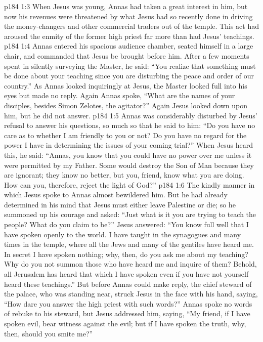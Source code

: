 \vs p184 1:3 When Jesus was young, Annas had taken a great interest in him, but now his revenues were threatened by what Jesus had so recently done in driving the money\hyp{}changers and other commercial traders out of the temple. This act had aroused the enmity of the former high priest far more than had Jesus’ teachings.
\vs p184 1:4 Annas entered his spacious audience chamber, seated himself in a large chair, and commanded that Jesus be brought before him. After a few moments spent in silently surveying the Master, he said: “You realize that something must be done about your teaching since you are disturbing the peace and order of our country.” As Annas looked inquiringly at Jesus, the Master looked full into his eyes but made no reply. Again Annas spoke, “What are the names of your disciples, besides Simon Zelotes, the agitator?” Again Jesus looked down upon him, but he did not answer.
\vs p184 1:5 Annas was considerably disturbed by Jesus’ refusal to answer his questions, so much so that he said to him: “Do you have no care as to whether I am friendly to you or not? Do you have no regard for the power I have in determining the issues of your coming trial?” When Jesus heard this, he said: \textcolor{ubdarkred}{“Annas, you know that you could have no power over me unless it were permitted by my Father. Some would destroy the Son of Man because they are ignorant; they know no better, but you, friend, know what you are doing. How can you, therefore, reject the light of God?”}
\vs p184 1:6 The kindly manner in which Jesus spoke to Annas almost bewildered him. But he had already determined in his mind that Jesus must either leave Palestine or die; so he summoned up his courage and asked: “Just what is it you are trying to teach the people? What do you claim to be?” Jesus answered: \textcolor{ubdarkred}{“You know full well that I have spoken openly to the world. I have taught in the synagogues and many times in the temple, where all the Jews and many of the gentiles have heard me. In secret I have spoken nothing; why, then, do you ask me about my teaching? Why do you not summon those who have heard me and inquire of them? Behold, all Jerusalem has heard that which I have spoken even if you have not yourself heard these teachings.”} But before Annas could make reply, the chief steward of the palace, who was standing near, struck Jesus in the face with his hand, saying, “How dare you answer the high priest with such words?” Annas spoke no words of rebuke to his steward, but Jesus addressed him, saying, \textcolor{ubdarkred}{“My friend, if I have spoken evil, bear witness against the evil; but if I have spoken the truth, why, then, should you smite me?”}
